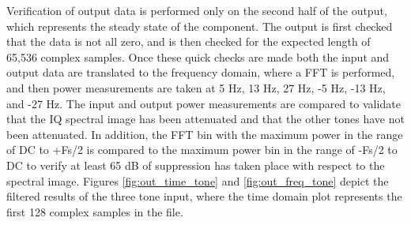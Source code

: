 \documentclass{article}
\begin{document}
	\begin{flushleft}
	Verification of output data is performed only on the second half of the output, which represents the steady state of the component. The output is first checked that the data is not all zero, and is then checked for the expected length of 65,536 complex samples. Once these quick checks are made both the input and output data are translated to the frequency domain, where a FFT is performed, and then power measurements are taken at 5 Hz, 13 Hz, 27 Hz, -5 Hz, -13 Hz, and -27 Hz. The input and output power measurements are compared to validate that the IQ spectral image has been attenuated and that the other tones have not been attenuated. In addition, the FFT bin with the maximum power in the range of DC to +Fs/2 is compared to the maximum power bin in the range of -Fs/2 to DC to verify at least 65 dB of suppression has taken place with respect to the spectral image. Figures \ref{fig:out_time_tone} and \ref{fig:out_freq_tone} depict the filtered results of the three tone input, where the time domain plot represents the first 128 complex samples in the file.
	\end{flushleft}
\end{document}
